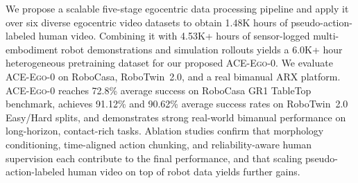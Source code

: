 \documentclass{article}
\newcommand{\OURS}{\textsc{ACE-Ego-0}\xspace}
\newcommand{\Ours}{\OURS}
\begin{document}

We propose a scalable five-stage egocentric data processing pipeline and apply it over six diverse egocentric video datasets to obtain 1.48K hours of pseudo-action-labeled human video. Combining it with 4.53K+ hours of sensor-logged multi-embodiment robot demonstrations and simulation rollouts yields a 6.0K+ hour heterogeneous pretraining dataset for our proposed \Ours. We evaluate \Ours on RoboCasa, RoboTwin~2.0, and a real bimanual ARX platform. \Ours reaches 72.8\% average success on RoboCasa GR1 TableTop benchmark, achieves 91.12\% and 90.62\% average success rates on RoboTwin~2.0 Easy/Hard splits, and demonstrates strong real-world bimanual performance on long-horizon, contact-rich tasks. Ablation studies confirm that morphology conditioning, time-aligned action chunking, and reliability-aware human supervision each contribute to the final performance, and that scaling pseudo-action-labeled human video on top of robot data yields further gains.
\end{document}
